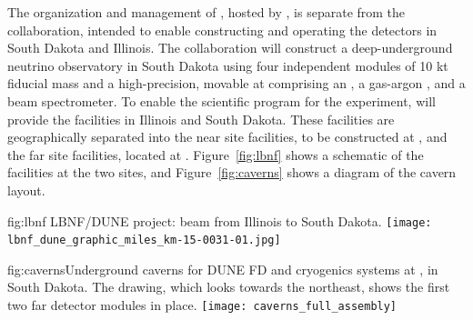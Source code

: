 The organization and management of , hosted by , is separate from the  collaboration, intended to enable constructing and operating the  detectors in South Dakota and Illinois. %
The  collaboration will construct a deep-underground neutrino observatory in South Dakota using four independent   modules of 10 kt fiducial mass
and a high-precision, movable  at  comprising an  , a gas-argon , and a beam spectrometer. 
To enable the scientific program for the  experiment,
 will provide the facilities in Illinois and South Dakota.
These facilities are geographically separated into the near site facilities, to be constructed
at , and the far site facilities, located at . Figure~\ref{fig:lbnf} shows
a schematic of the facilities at the two sites, and Figure~\ref{fig:caverns} shows a diagram of the cavern layout. 


\begin{dunefigure}{fig:lbnf}{ 	
LBNF/DUNE project: beam from Illinois to South Dakota.}
\texttt{[image: lbnf\_dune\_graphic\_miles\_km-15-0031-01.jpg]}
\end{dunefigure}

\begin{dunefigure}{fig:caverns}{Underground caverns for DUNE FD and cryogenics systems at , in South Dakota. The drawing, which looks towards the northeast, shows the first two far detector modules in place.}
\texttt{[image: caverns\_full\_assembly]}
\end{dunefigure}


